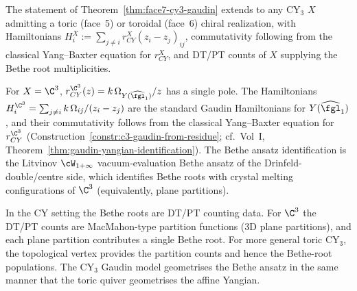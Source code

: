 \begin{conjecture}
\label{conj:face7-general-gaudin}
\ClaimStatusConjectured
The statement of Theorem~\ref{thm:face7-cy3-gaudin} extends to any
CY$_3$ $X$ admitting a toric (face~5) or toroidal (face~6) chiral
realization, with Hamiltonians $H_i^{X} := \sum_{j \neq i} r_{CY}^X(z_i
- z_j)_{ij}$, commutativity following from the classical Yang--Baxter
equation for $r_{CY}^X$, and DT/PT counts of $X$ supplying the Bethe
root multiplicities.
\end{conjecture}

\begin{remark}[\texorpdfstring{$\C^3$}{C-3}]
For $X = \C^3$, $r_{CY}^{\C^3}(z) = k\,\Omega_{Y(\widehat{\fgl}_1)}/z$ has
a single pole. The Hamiltonians $H_i^{\C^3} = \sum_{j \neq i}
k\,\Omega_{ij}/(z_i - z_j)$ are the standard Gaudin Hamiltonians for
$Y(\widehat{\fgl}_1)$, and their commutativity follows from the
classical Yang--Baxter equation for $r_{CY}^{\C^3}$
(Construction~\ref{constr:c3-gaudin-from-residue}; cf.\ Vol~I,
Theorem~\ref{thm:gaudin-yangian-identification}). The Bethe ansatz
identification is the Litvinov $\cW_{1+\infty}$ vacuum-evaluation Bethe
ansatz of the Drinfeld-double/centre side, which identifies Bethe roots
with crystal melting configurations of $\C^3$ (equivalently, plane
partitions).
\end{remark}

\begin{remark}
\label{rem:cy3-bethe-content}
In the CY setting the Bethe roots are DT/PT counting data. For $\C^3$
the DT/PT counts are MacMahon-type partition functions (3D plane
partitions), and each plane partition contributes a single Bethe root.
For more general toric CY$_3$, the topological vertex provides the
partition counts and hence the Bethe-root populations. The CY$_3$
Gaudin model geometrises the Bethe ansatz in the same manner that the
toric quiver geometrises the affine Yangian.
\end{remark}

